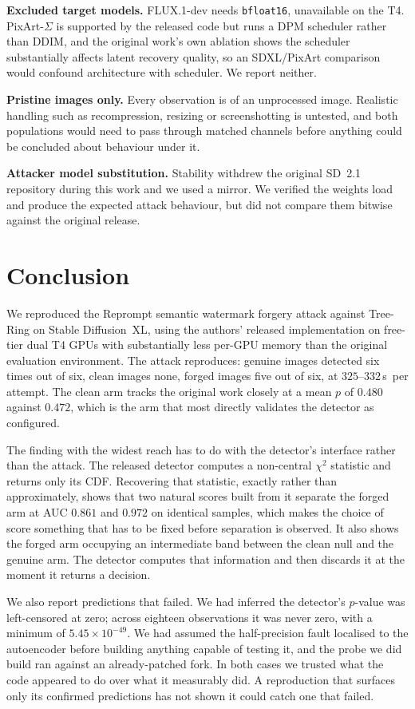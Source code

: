 \documentclass[10pt,twocolumn]{article}
\newcommand{\code}[1]{\texttt{\small #1}}
\newcommand{\reptime}{$325$--$332$\,s}
\begin{document}
\textbf{Excluded target models.} FLUX.1-dev needs \code{bfloat16}, unavailable on the
T4. PixArt-$\Sigma$ is supported by the released code but runs a DPM scheduler rather
than DDIM, and the original work's own ablation shows the scheduler substantially
affects latent recovery quality, so an SDXL/PixArt comparison would confound
architecture with scheduler. We report neither.

\textbf{Pristine images only.} Every observation is of an unprocessed image. Realistic
handling such as recompression, resizing or screenshotting is untested, and both
populations would need to pass through matched channels before anything could be
concluded about behaviour under it.

\textbf{Attacker model substitution.} Stability withdrew the original SD~2.1
repository during this work and we used a mirror. We verified the weights load and
produce the expected attack behaviour, but did not compare them bitwise against the
original release.

\section{Conclusion}

We reproduced the Reprompt semantic watermark forgery attack against Tree-Ring on
Stable Diffusion~XL, using the authors' released implementation on free-tier dual T4 GPUs with substantially less
per-GPU memory than the original evaluation environment. The attack
reproduces: genuine images detected six times out of six, clean images none, forged
images five out of six, at \reptime\ per attempt. The clean arm tracks the original
work closely at a mean $p$ of $0.480$ against $0.472$, which is the arm that most
directly validates the detector as configured.

The finding with the widest reach has to do with the detector's interface
rather than the attack. The released detector computes a non-central $\chi^2$
statistic and returns only its CDF. Recovering that statistic, exactly rather than
approximately, shows that two natural scores built from it separate the forged arm at
AUC $0.861$ and $0.972$ on identical samples, which makes the choice of score
something that has to be fixed before separation is observed. It also shows the forged
arm occupying an intermediate band between the clean null and the genuine arm.
The detector computes that information and then discards it at the moment it returns a
decision.

We also report predictions that failed. We had inferred the detector's $p$-value was
left-censored at zero; across eighteen observations it was never zero, with a minimum
of $5.45 \times 10^{-49}$. We had assumed the half-precision fault localised to the
autoencoder before building anything capable of testing it, and the probe we did build
ran against an already-patched fork. In both cases we trusted what the code appeared
to do over what it measurably did. A reproduction that surfaces only its
confirmed predictions has not shown it could catch one that failed.
\end{document}
